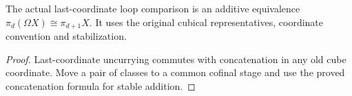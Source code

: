 \begin{proposition}
  \label{prop:actual-additive-loop-degree}
  \leanok
  The actual last-coordinate loop comparison is an additive equivalence $\pi_d(\Omega X)\cong\pi_{d+1}X$. It uses the original cubical representatives, coordinate convention and stabilization.
\end{proposition}
\begin{proof}
  Last-coordinate uncurrying commutes with concatenation in any old cube coordinate. Move a pair of classes to a common cofinal stage and use the proved concatenation formula for stable addition.
  \leanok
\end{proof}

